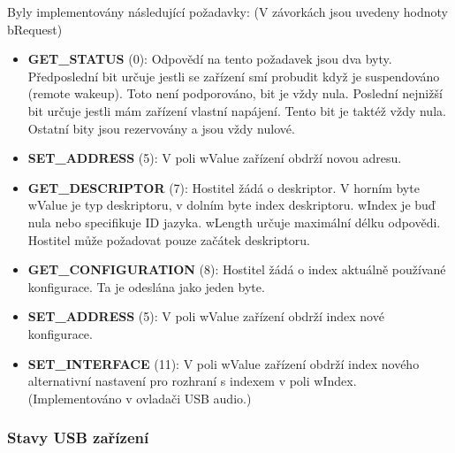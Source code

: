 Byly implementovány následující požadavky: (V závorkách jsou uvedeny hodnoty bRequest)
\begin{itemize}

\item \textbf{GET\_STATUS} (0): Odpovědí na tento požadavek jsou dva byty. Předposlední bit určuje jestli se zařízení smí probudit když je suspendováno (remote wakeup). Toto není podporováno, bit je vždy nula. Poslední nejnižší bit určuje jestli mám zařízení vlastní napájení. Tento bit je taktéž vždy nula. Ostatní bity jsou rezervovány a jsou vždy nulové.

\item \textbf{SET\_ADDRESS} (5): V poli wValue zařízení obdrží novou adresu.

\item \textbf{GET\_DESCRIPTOR} (7): Hostitel žádá o deskriptor. V horním byte wValue je typ deskriptoru, v dolním byte index deskriptoru. wIndex je buď nula nebo specifikuje ID jazyka. wLength určuje maximální délku odpovědi. Hostitel může požadovat pouze začátek deskriptoru.

\item \textbf{GET\_CONFIGURATION} (8): Hostitel žádá o index aktuálně používané konfigurace. Ta je odeslána jako jeden byte.

\item \textbf{SET\_ADDRESS} (5): V poli wValue zařízení obdrží index nové konfigurace.

\item \textbf{SET\_INTERFACE} (11): V poli wValue zařízení obdrží index nového alternativní nastavení pro rozhraní s indexem v poli wIndex. (Implementováno v ovladači USB audio.)

\end{itemize}

\subsubsection{Stavy USB zařízení}
\label{subsubsec:usb-states}


